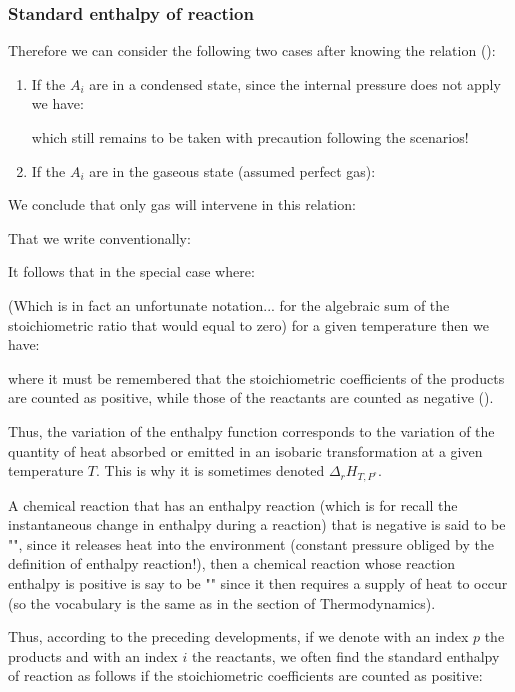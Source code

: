 	\subsubsection{Standard enthalpy of reaction}
	Therefore we can consider the following two cases after knowing the relation ():
	
	\begin{enumerate}
		\item If the $A_i$ are in a condensed state, since the internal pressure does not apply we have:
		
		which still remains to be taken with precaution following the scenarios!

		\item If the $A_i$ are in the gaseous state (assumed perfect gas):
		
	\end{enumerate}
	We conclude that only gas will intervene in this relation:
	
	That we write conventionally:
	
	It follows that in the special case where:
	
	(Which is in fact an unfortunate notation... for the algebraic sum of the stoichiometric ratio that would equal to zero) for a given temperature then we have:
	
	where it must be remembered that the stoichiometric coefficients of the products are counted as positive, while those of the reactants are counted as negative ().
	
	Thus, the variation of the enthalpy function corresponds to the variation of the quantity of heat absorbed or emitted in an isobaric transformation at a given temperature $T$. This is why it is sometimes denoted $\Delta_r H_{T,P^\circ}$.

	A chemical reaction that has an enthalpy reaction (which is for recall the instantaneous change in enthalpy during a reaction) that is negative is said to be "", since it releases heat into the environment (constant pressure obliged by the definition of enthalpy reaction!), then a chemical reaction whose reaction enthalpy is positive is say to be "" since it then requires a supply of heat to occur (so the vocabulary is the same as in the section of Thermodynamics).

	Thus, according to the preceding developments, if we denote with an index $p$ the products and with an index $i$ the reactants, we often find the standard enthalpy of reaction as follows if the stoichiometric coefficients are counted as positive:
	
